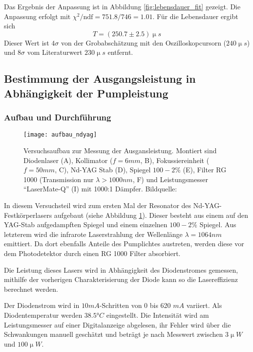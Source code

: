 \documentclass{../Misc/MontavonLaTeX/Montavon}
\newcommand{\fullwidth}{1.0\textwidth}
\begin{document}
Das Ergebnis der Anpassung ist in Abbildung \ref{fig:lebensdauer_fit} gezeigt. Die Anpassung erfolgt mit $\chi^2 / \textrm{ndf} = 751.8 / 746 = 1.01$. Für die Lebensdauer ergibt sich
\[
	T = (250.7 \pm 2.5) \unit{\upmu s}
\]
Dieser Wert ist $4 \sigma$ von der Grobabschätzung mit den Oszilloskopcursorn ($240 \unit{\upmu s}$) und $8 \sigma$ vom Literaturwert $230 \unit{\upmu s}$ entfernt.

\subsection{Bestimmung der Ausgangsleistung in Abhängigkeit der Pumpleistung}
\subsubsection{Aufbau und Durchführung}
\begin{figure}[htbp]
\centering
\texttt{[image: aufbau\_ndyag]}
\caption{Versuchsaufbau zur Messung der Ausgansleistung. Montiert sind Diodenlaser (A), Kollimator ($f = 6 \unit{mm}$, B), Fokussiereinheit ($f = 50 \unit{mm}$, C), Nd-YAG Stab (D), Spiegel $100-2 \unit{\%}$ (E), Filter RG 1000 (Transmission nur $\lambda > 1000 \unit{nm}$, F) und Leistungsmesser \enquote{LaserMate-Q} (I) mit 1000:1 Dämpfer. Bildquelle: \cite[S. 36]{anleitung1}}
\label{fig:aufbau_ndyag}
\end{figure}

In diesem Versuchsteil wird zum ersten Mal der Resonator des Nd-YAG-Festkörperlasers aufgebaut (siehe Abbildung \ref{fig:aufbau_ndyag}). Dieser besteht aus einem auf den YAG-Stab aufgedampften Spiegel und einem einzelnen $100 - 2 \unit{\%}$ Spiegel. Aus letzterem wird die infrarote Laserstrahlung der Wellenlänge $\lambda = 1064 \unit{nm}$ emittiert. Da dort ebenfalls Anteile des Pumplichtes austreten, werden diese vor dem Photodetektor durch einen RG 1000 Filter absorbiert.

Die Leistung dieses Lasers wird in Abhängigkeit des Diodenstromes gemessen, mithilfe der vorherigen Charakterisierung der Diode kann so die Lasereffizienz berechnet werden.

Der Diodenstrom wird in $10 \unit{mA}$-Schritten von 0 bis 620 $\unit{mA}$ variiert. Als Diodentemperatur werden $38.5 \unit{\degree C}$ eingestellt.
Die Intensität wird am Leistungsmesser auf einer Digitalanzeige abgelesen, ihr Fehler wird über die Schwankungen manuell geschätzt und beträgt je nach Messwert zwischen $3 \unit{\upmu W}$ und $100 \unit{\upmu W}$.
\end{document}

